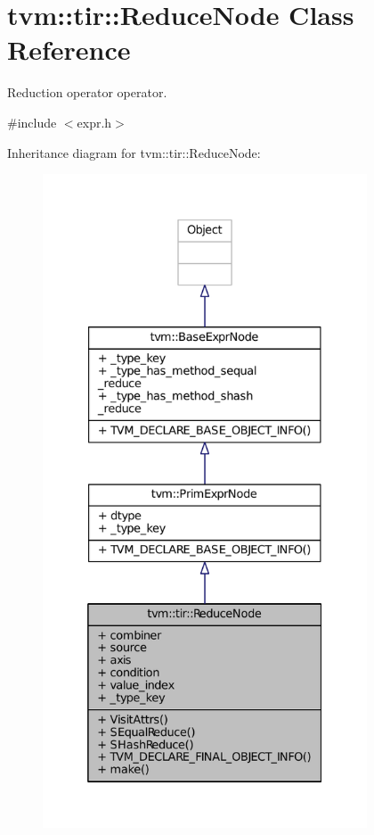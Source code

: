 \hypertarget{classtvm_1_1tir_1_1ReduceNode}{}\section{tvm\+:\+:tir\+:\+:Reduce\+Node Class Reference}
\label{classtvm_1_1tir_1_1ReduceNode}


Reduction operator operator.  




{\ttfamily \#include $<$expr.\+h$>$}



Inheritance diagram for tvm\+:\+:tir\+:\+:Reduce\+Node\+:
\nopagebreak
\begin{figure}[H]
\begin{center}
\leavevmode
\includegraphics[height=550pt]{classtvm_1_1tir_1_1ReduceNode__inherit__graph}
\end{center}
\end{figure}


